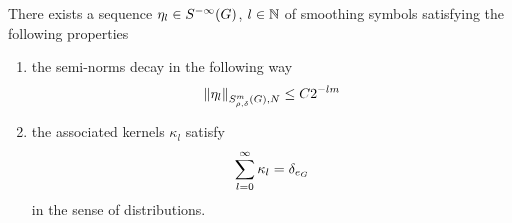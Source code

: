 \begin{theorem}
\label{theorem:Littlewood-Paley_decomposition}
    There exists a sequence $\eta_l \in \SmoothingSymbols$, $l \in \N$ of smoothing symbols satisfying the following properties
    \begin{enumerate}
        \item the semi-norms decay in the following way
            \begin{align}
                \SymbolSemiNorm{m}{\rho, \delta} N {\eta_l} \leq C 2^{-lm}
            \end{align}
        \item the associated kernels $\kappa_l$ satisfy
            \begin{align*}
                \sum_{l = 0}^\infty \kappa_l = \DiracDelta{e_\Group}
            \end{align*}
            in the sense of distributions.
    \end{enumerate}
\end{theorem}
